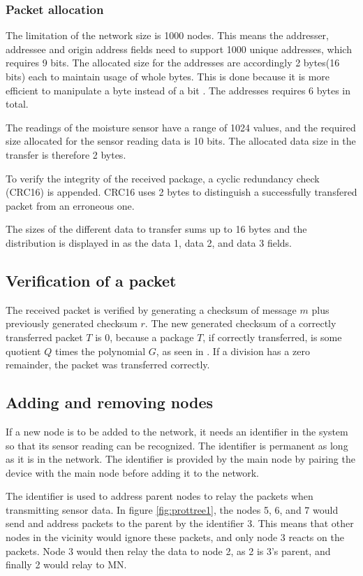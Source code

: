 \subsubsection{Packet allocation}
The limitation of the network size is 1000 nodes. This means the addresser, addressee and origin address fields need to support 1000 unique addresses, which requires 9 bits. The allocated size for the addresses are accordingly 2 bytes(16 bits) each to maintain usage of whole bytes. This is done because it is more efficient to manipulate a byte instead of a bit \cite{bytevsbit}. The addresses requires 6 bytes in total.

The readings of the moisture sensor have a range of 1024 values, and the required size allocated for the sensor reading data is 10 bits. The allocated data size in the transfer is therefore 2 bytes.

To verify the integrity of the received package, a cyclic redundancy check (CRC16) is appended. CRC16 uses 2 bytes to distinguish a successfully transfered packet from an erroneous one.

The sizes of the different data to transfer sums up to 16 bytes and the distribution is displayed in  as the data 1, data 2, and data 3 fields.

\subsection{Verification of a packet}
The received packet is verified by generating a checksum of message $m$ plus previously generated checksum $r$.
The new generated checksum of a correctly transferred packet $T$ is 0, because a package $T$, if correctly transferred, is some quotient $Q$ times the polynomial $G$, as seen in . If a division has a zero remainder, the packet was transferred correctly.

\subsection{Adding and removing nodes}
If a new node is to be added to the network, it needs an identifier in the system so that its sensor reading can be recognized. The identifier is permanent as long as it is in the network.
The identifier is provided by the main node by pairing the device with the main node before adding it to the network. 

The identifier is used to address parent nodes to relay the packets when transmitting sensor data. In figure \ref{fig:prottree1}, the nodes 5, 6, and 7 would send and address packets to the parent by the identifier 3. This means that other nodes in the vicinity would ignore these packets, and only node 3 reacts on the packets. Node 3 would then relay the data to node 2, as 2 is 3's parent, and finally 2 would relay to MN.

